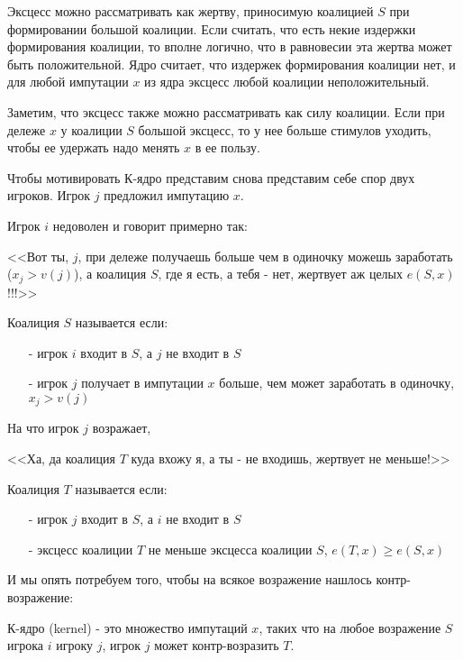 Эксцесс можно рассматривать как жертву, приносимую коалицией $S$ при формировании большой коалиции. Если считать, что есть некие издержки формирования коалиции, то вполне логично, что в равновесии эта жертва может быть положительной. Ядро считает, что издержек формирования коалиции нет, и для любой импутации $x$ из ядра эксцесс любой коалиции неположительный.

Заметим, что эксцесс также можно рассматривать как силу коалиции. Если при дележе $x$ у коалиции $S$ большой эксцесс, то у нее больше стимулов уходить, чтобы ее удержать надо менять $x$ в ее пользу.

Чтобы мотивировать К-ядро представим снова представим себе спор двух игроков. Игрок $j$ предложил импутацию $x$. 

Игрок $i$ недоволен и говорит примерно так: 

<<Вот ты, $j$, при дележе получаешь больше чем в одиночку можешь заработать ($x_{j}>v(j)$), а коалиция $S$, где я есть, а тебя - нет, жертвует аж целых $e(S,x)$!!!>>

\begin{mydef}
Коалиция $S$ называется  если:
\begin{itemize}
\item[-] игрок $i$ входит в $S$, а $j$ не входит в $S$
\item[-] игрок $j$ получает в импутации $x$ больше, чем может заработать в одиночку, $x_{j}>v(j)$
\end{itemize}
\end{mydef}

На что игрок $j$ возражает,

<<Ха, да коалиция $T$ куда вхожу я, а ты - не входишь, жертвует не меньше!>>

\begin{mydef}
Коалиция $T$ называется  если:
\begin{itemize}
\item[-] игрок $j$ входит в $S$, а $i$ не входит в $S$
\item[-] эксцесс коалиции $T$ не меньше эксцесса коалиции $S$, $e(T,x)\geq e(S,x)$
\end{itemize}
\end{mydef}


И мы опять потребуем того, чтобы на всякое возражение нашлось контр-возражение:

\begin{mydef}
К-ядро  (kernel) - это множество импутаций $x$, таких что на любое возражение $S$ игрока $i$ игроку $j$, игрок $j$ может контр-возразить $T$. 
\end{mydef}


